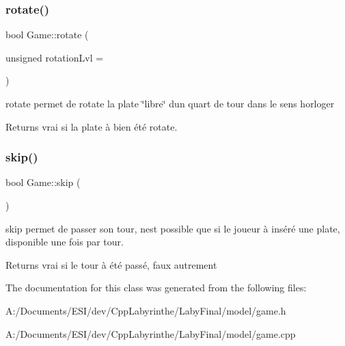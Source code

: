 \subsubsection{\texorpdfstring{rotate()}{rotate()}}
{\footnotesize\ttfamily bool Game\+::rotate (\begin{DoxyParamCaption}\item[{unsigned}]{rotation\+Lvl = {} }\end{DoxyParamCaption})}



rotate permet de rotate la plate \char`\"{}libre\char`\"{} d\textquotesingle{}un quart de tour dans le sens horloger 

\begin{DoxyReturn}{Returns}
vrai si la plate à bien été rotate. 
\end{DoxyReturn}
\mbox{\label{class_game_a1d391affe8e71a520a9e210e76b23b45}} 
\subsubsection{\texorpdfstring{skip()}{skip()}}
{\footnotesize\ttfamily bool Game\+::skip (\begin{DoxyParamCaption}{ }\end{DoxyParamCaption})}



skip permet de passer son tour, n\textquotesingle{}est possible que si le joueur à inséré une plate, disponible une fois par tour. 

\begin{DoxyReturn}{Returns}
vrai si le tour à été passé, faux autrement 
\end{DoxyReturn}


The documentation for this class was generated from the following files\+:\begin{DoxyCompactItemize}
\item 
A\+:/\+Documents/\+E\+S\+I/dev/\+Cpp\+Labyrinthe/\+Laby\+Final/model/game.\+h\item 
A\+:/\+Documents/\+E\+S\+I/dev/\+Cpp\+Labyrinthe/\+Laby\+Final/model/game.\+cpp\end{DoxyCompactItemize}
